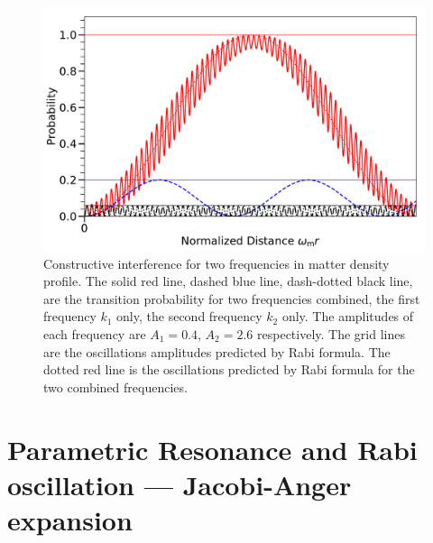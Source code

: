 \begin{figure}[!htbp]
    \centering
    \includegraphics[width=\textwidth]{chapters/assets/rabi/rabiOscillationsNeutrinoCoincidence-two-frequencies-constructive.pdf}
    \caption{Constructive interference for two frequencies in matter density profile. The solid red line, dashed blue line, dash-dotted black line, are the transition probability for two frequencies combined, the first frequency $k_1$ only, the second frequency $k_2$ only. The amplitudes of each frequency are $A_1=0.4$, $A_2=2.6$ respectively. The grid lines are the oscillations amplitudes predicted by Rabi formula. The dotted red line is the oscillations predicted by Rabi formula for the two combined frequencies.}
    \label{chap:matter-sec:constructive-fig:two-frequencies-constructive}
\end{figure}




\section{\label{sec:jacobi}Parametric Resonance and Rabi oscillation --- Jacobi-Anger expansion}


